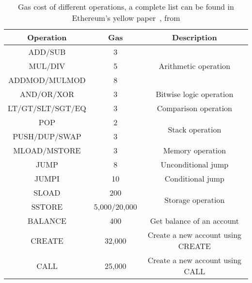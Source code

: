 \begin{table}[H]
	\centering
	\vspace*{-1ex}
	\scriptsize
	\caption{Gas cost of different operations, a complete list can be found in Ethereum's yellow paper~\cite{gas}, from \cite{DBLP:journals/corr/ChenLLZ17}}
	\vspace{-1ex}
	\label{table:opcode_table}
	\begin{tabular}{|c|c|c|}
		\hline
		\textbf{Operation}        & \textbf{Gas} & \textbf{Description} \\ \hline
		\textsc{ADD/SUB}          & 3 & \multirow{3}{*}{Arithmetic operation} \\ \cline{1-2}
		\textsc{MUL/DIV}          & 5 & \\ \cline{1-2}
		\textsc{ADDMOD/MULMOD}    & 8 & \\ \hline
		\textsc{AND/OR/XOR}       & 3 & Bitwise logic operation \\ \hline
		\textsc{LT/GT/SLT/SGT/EQ} & 3 & Comparison operation \\ \hline
		\textsc{POP}              & 2 & \multirow{2}{*}{Stack operation} \\ \cline{1-2}
		\textsc{PUSH/DUP/SWAP}    & 3 & \\ \hline
		\textsc{MLOAD/MSTORE}     & 3 & Memory operation \\ \hline
		\textsc{JUMP}             & 8 & Unconditional jump \\ \hline
		\textsc{JUMPI}            & 10 & Conditional jump \\ \hline
		\textsc{SLOAD}            & 200 & \multirow{2}{*}{Storage operation} \\ \cline{1-2}
		\textsc{SSTORE}           & 5,000/20,000 & \\ \hline
		\textsc{BALANCE}          & 400 & Get balance of an account \\ \hline
		\textsc{CREATE}           & 32,000 & Create a new account using CREATE \\ \hline
		\textsc{CALL}             & 25,000 & Create a new account using CALL \\  \hline
	\end{tabular}
	\vspace{-2ex}
\end{table}
